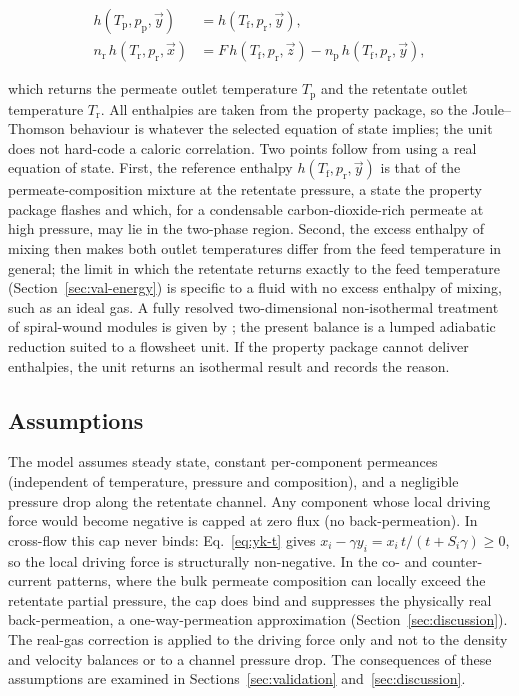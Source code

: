 \documentclass[a4paper,fleqn]{cas-dc}
\begin{document}
\begin{equation}\label{eq:energy}
\begin{aligned}
h(T_\mathrm{p}, p_\mathrm{p}, \vec{y}) &= h(T_\mathrm{f}, p_\mathrm{r}, \vec{y}), \\
n_\mathrm{r}\,h(T_\mathrm{r}, p_\mathrm{r}, \vec{x}) &=
   F\,h(T_\mathrm{f}, p_\mathrm{r}, \vec{z}) - n_\mathrm{p}\,h(T_\mathrm{f}, p_\mathrm{r}, \vec{y}),
\end{aligned}
\end{equation}

which returns the permeate outlet temperature $T_\mathrm{p}$ and the retentate
outlet temperature $T_\mathrm{r}$. All enthalpies are taken from the property
package, so the Joule--Thomson behaviour is whatever the selected equation of
state implies; the unit does not hard-code a caloric correlation. Two points
follow from using a real equation of state. First, the reference enthalpy
$h(T_\mathrm{f}, p_\mathrm{r}, \vec{y})$ is that of the permeate-composition
mixture at the retentate pressure, a state the property package flashes and which,
for a condensable carbon-dioxide-rich permeate at high pressure, may lie in the
two-phase region. Second, the excess enthalpy of mixing then makes both outlet
temperatures differ from the feed temperature in general; the limit in which the
retentate returns exactly to the feed temperature (Section~\ref{sec:val-energy})
is specific to a fluid with no excess enthalpy of mixing, such as an ideal gas. A
fully resolved two-dimensional non-isothermal treatment of spiral-wound modules
is given by \citet{fontoura2022}; the present balance is a lumped adiabatic
reduction suited to a flowsheet unit. If the property package cannot deliver
enthalpies, the unit returns an isothermal result and records the reason.

\subsection{Assumptions}\label{sec:model-assumptions}
The model assumes steady state, constant per-component permeances (independent of
temperature, pressure and composition), and a negligible pressure drop along the
retentate channel. Any component whose local driving force would become negative
is capped at zero flux (no back-permeation). In cross-flow this cap never binds:
Eq.~\eqref{eq:yk-t} gives $x_i - \gamma y_i = x_i\,t/(t + S_i\gamma) \ge 0$, so the
local driving force is structurally non-negative. In the co- and counter-current
patterns, where the bulk permeate composition can locally exceed the retentate
partial pressure, the cap does bind and suppresses the physically real
back-permeation, a one-way-permeation approximation
(Section~\ref{sec:discussion}). The real-gas correction is applied to the driving
force only and not to the density and velocity balances or to a channel pressure
drop. The consequences of these assumptions are examined in
Sections~\ref{sec:validation} and~\ref{sec:discussion}.
\end{document}
